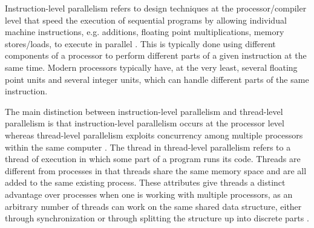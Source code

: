 Instruction-level parallelism refers to design techniques at the processor/compiler level that speed the execution of sequential programs by allowing individual machine instructions, e.g. additions, floating point multiplications, memory stores/loads, to execute in parallel \cite{ilp_history}. This is typically done using different components of a processor to perform different parts of a given instruction at the same time. Modern processors typically have, at the very least, several floating point units and several integer units, which can handle different parts of the same instruction. 

The main distinction between instruction-level parallelism and thread-level parallelism is that instruction-level parallelism occurs at the processor level whereas thread-level parallelism exploits concurrency among multiple processors within the same computer \cite{hpc_openstax}.  The thread in thread-level parallelism refers to a thread of execution in which some part of a program runs its code. Threads are different from processes in that threads share the same memory space and are all added to the same existing process. These attributes give threads a distinct advantage over processes when one is working with multiple processors, as an arbitrary number of threads can work on the same shared data structure, either through synchronization or through splitting the structure up into discrete parts \cite{hpc_openstax}. 


